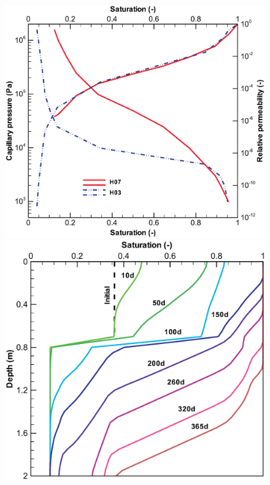 \begin{figure}[htb!]
\begin{center}
\begin{minipage}[t]{0.45\textwidth}
\begin{center}
      \end{center}
    \end{minipage}\\
  \end{center}
%
  \begin{center}
    \begin{minipage}[t]{0.45\textwidth}
      \begin{center}
        \includegraphics[scale=0.27]{H_US/figures/Soil_P2.eps}
      \end{center}
    \end{minipage}
    \begin{minipage}[t]{0.45\textwidth}
      \begin{center}
        \includegraphics[scale=0.27]{H_US/figures/pl2_s.eps}

\end{center}
\end{minipage}
\end{center}
\end{figure}

